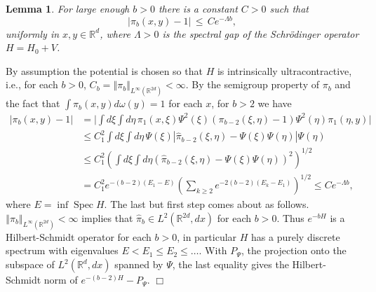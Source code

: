 \documentclass[a4paper,11pt]{article}
\newtheorem{lemma}[theorem]{Lemma}
\newenvironment{proof}[1][Proof]{{\sc #1.} }{\hfill $\Box$}
\newcommand{\R}{\mathbb{R}}
\newcommand {\norm} [2] [] {\ensuremath{ \left\Vert  #2  \right\Vert_{#1} } }
\newcommand{\Spec}{\mathop{\mathrm{Spec}}\nolimits}
\newcounter {constant}
\begin{document}
\begin{lemma}
\label{lemma:trans}
For large enough $b > 0$ there is a constant $C > 0$ such that
\begin{equation}
|\pi_b(x,y) - 1| \,\leq\, Ce^{-\Lambda b},
\end{equation}
uniformly in $x,y \in \R^d$, where $\Lambda > 0$ is the spectral gap of the 
Schr\"odinger operator $H = H_0 + V$. 
\label{holderpfi}
\end{lemma}
\begin{proof}
By assumption the potential is chosen so that $H$ is intrinsically 
ultracontractive, i.e., for each $b > 0$, $C_b = \norm[L^{\infty}(\R^{2d})]{\pi_b} 
< \infty$. 
 By the semigroup property of $\pi_b$ and the fact that $\int \pi_b(x,y) d\omega(y) = 
 1$ for each $x$, for $b > 2$ we have
 \begin{equation}
 \label{iucestimate}
 \begin{split}
 |\pi_b(x,y) - 1| 
 & =  
 \Big| \int d\xi \int d\eta \,  \pi_1(x,\xi)\Psi^2(\xi) (\pi_{b-2}(\xi,\eta) - 1) 
 \Psi^2(\eta) \pi_1(\eta,y) \Big| \\
 & \leq  
 C_1^2 \int d\xi \int d\eta \, \Psi(\xi) | \hat\pi_{b-2}(\xi,\eta) - 
 \Psi(\xi)\Psi(\eta)| \Psi(\eta)  \\
 & \leq  
 C_1^2 \left( \int d\xi \int d\eta (\hat\pi_{b-2}(\xi,\eta) - \Psi(\xi) \Psi(\eta))^2 
 \right)^{1/2}  \\
 & = 
 C_{1}^2 e^{-(b-2)(E_1-E)} \left(\sum_{k\geq 2} e^{-2(b-2)(E_k- E_1)} \right)^{1/2} 
\leq  
 Ce^{-\Lambda b},
  \end{split}
  \end{equation}
where $E = \inf \Spec H$.
The last but first step comes about as follows. $\norm[L^{\infty}(\R^{2d})]{\pi_b} < \infty$ 
implies that $\hat\pi_b \in L^2(\R^{2d},dx)$ for each $b > 0$. Thus $e^{-bH}$ is a 
Hilbert-Schmidt operator for each $b>0$, in particular $H$ has a purely discrete spectrum 
with eigenvalues $E < E_{1} \leq E_{2} \leq \ldots$. With $P_\Psi$, the projection onto 
the subspace of $L^2(\R^d,dx)$ spanned by $\Psi$, the last equality gives the Hilbert-Schmidt 
norm of $e^{-(b-2)H} - P_\Psi$.
\end{proof}
\end{document}
